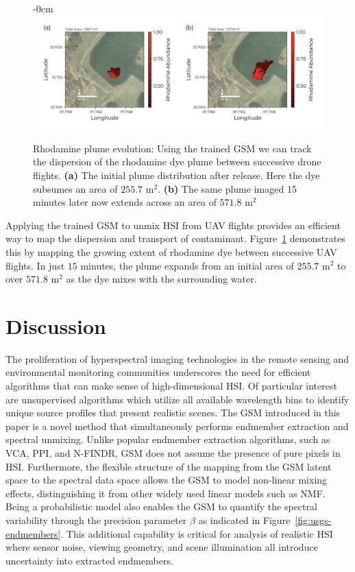 \documentclass[remotesensing,article,submit,pdftex,moreauthors]{Definitions/mdpi}
\begin{document}
\begin{figure}[H]
\begin{adjustwidth}{-\extralength}{0cm}
\centering
\includegraphics[width=1.35\columnwidth]{results/robot-team/plume-evo.pdf}
\end{adjustwidth}
\caption{Rhodamine plume evolution: Using the trained GSM we can track the dispersion of the rhodamine dye plume between successive drone flights. \textbf{(a)} The initial plume distribution after release. Here the dye subsumes an area of $255.7$ $\text{m}^2$. \textbf{(b)} The same plume imaged 15 minutes later now extends across an area of $571.8$ $\text{m}^2$}
\label{fig:plume-evo}
\end{figure}  

Applying the trained GSM to unmix HSI from UAV flights provides an efficient way to map the dispersion and transport of contaminant. Figure~\ref{fig:plume-evo} demonstrates this by mapping the growing extent of rhodamine dye between successive UAV flights. In just $15$ minutes, the plume expands from an initial area of $255.7$ $\text{m}^2$ to over $571.8$ $\text{m}^2$ as the dye mixes with the surrounding water. 

\section{Discussion}\label{sec:disucssion}

The proliferation of hyperspectral imaging technologies in the remote sensing and environmental monitoring communities underscores the need for efficient algorithms that can make sense of high-dimensional HSI. Of particular interest are unsupervised algorithms which utilize all available wavelength bins to identify unique source profiles that present realistic scenes. The GSM introduced in this paper is a novel method that simultaneously performs endmember extraction and spectral unmixing. Unlike popular endmember extraction algorithms, such as VCA, PPI, and N-FINDR, GSM does not assume the presence of pure pixels in HSI. Furthermore, the flexible structure of the mapping from the GSM latent space to the spectral data space allows the GSM to model non-linear mixing effects, distinguishing it from other widely used linear models such as NMF. Being a probabilistic model also enables the GSM to quantify the spectral variability through the precision parameter $\beta$ as indicated in Figure~\ref{fig:usgs-endmembers}. This additional capability is critical for analysis of realistic HSI where sensor noise, viewing geometry, and scene illumination all introduce uncertainty into extracted endmembers.
\end{document}

